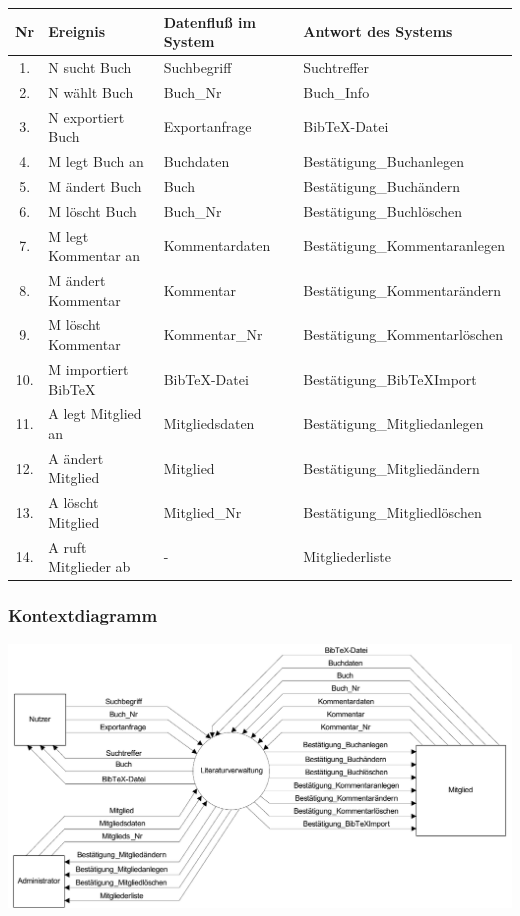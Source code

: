 \begin{longtable}{|c|p{9.0em}|p{10.5em}|l|}
\hline
Nr & Ereignis & Datenfluß im System & Antwort des Systems \\
\hline\hline
\endhead

1. & N sucht Buch & Suchbegriff & Suchtreffer \\\hline
2. & N wählt Buch & Buch\_Nr & Buch\_Info \\\hline
3. & N exportiert Buch & Exportanfrage &  BibTeX-Datei \\\hline
4. & M legt Buch an & Buchdaten & Bestätigung\_Buchanlegen \\\hline
5. & M ändert Buch & Buch & Bestätigung\_Buchändern\\\hline
6. & M löscht Buch & Buch\_Nr & Bestätigung\_Buchlöschen \\\hline
7. & M legt Kommentar an & Kommentardaten & Bestätigung\_Kommentaranlegen \\\hline
8. & M ändert Kommentar & Kommentar & Bestätigung\_Kommentarändern \\\hline
9. & M löscht Kommentar & Kommentar\_Nr & Bestätigung\_Kommentarlöschen \\\hline
10.& M importiert BibTeX & BibTeX-Datei & Bestätigung\_BibTeXImport \\\hline
11.& A legt Mitglied an & Mitgliedsdaten & Bestätigung\_Mitgliedanlegen \\\hline
12.& A ändert Mitglied & Mitglied & Bestätigung\_Mitgliedändern \\\hline
13.& A löscht Mitglied & Mitglied\_Nr & Bestätigung\_Mitgliedlöschen \\\hline
14.& A ruft Mitglieder ab & - & Mitgliederliste \\\hline
\end{longtable}

\newpage %
\subsubsection{Kontextdiagramm}

\includegraphics[scale=0.75]{kontextdiagramm}

